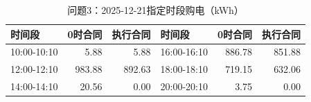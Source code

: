 \begin{table}[H]\centering\small\caption{问题3：2025-12-21指定时段购电（kWh）}\label{tab:q320251221p}
\begin{tabular}{lrrlrr}\toprule
时间段 & 0时合同 & 执行合同 & 时间段 & 0时合同 & 执行合同\\\midrule
10:00-10:10 & 5.88 & 5.88 & 16:00-16:10 & 886.78 & 851.88\\
12:00-12:10 & 983.88 & 892.63 & 18:00-18:10 & 719.15 & 632.06\\
14:00-14:10 & 20.56 & 0.00 & 20:00-20:10 & 3.75 & 0.00\\
\bottomrule\end{tabular}\end{table}
